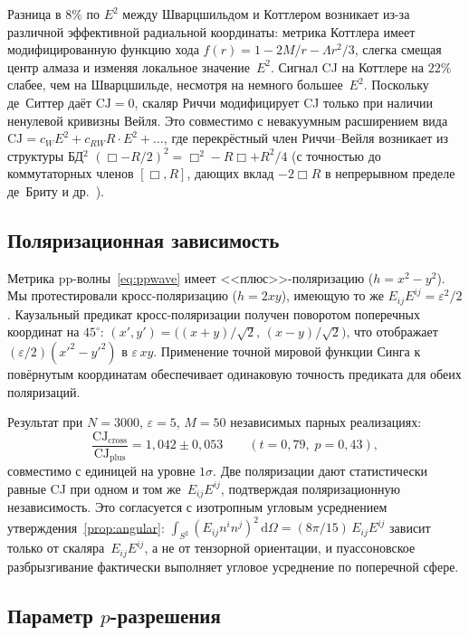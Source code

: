 \documentclass[12pt,a4paper]{article}
\theoremstyle{plain}
\theoremstyle{definition}
\theoremstyle{remark}
\newcommand{\dd}{\mathrm{d}}
\newcommand{\Esq}{E_{ij}E^{ij}}
\newcommand{\CJ}{\mathrm{CJ}}
\begin{document}
Разница в $8\%$ по $E^2$ между Шварцшильдом и Коттлером
возникает из-за различной эффективной радиальной координаты:
метрика Коттлера имеет модифицированную функцию хода
$f(r) = 1 - 2M/r - \Lambda r^2/3$, слегка смещая центр
алмаза и изменяя локальное значение~$E^2$.  Сигнал CJ на
Коттлере на $22\%$ слабее, чем на Шварцшильде, несмотря на
немного большее~$E^2$.  Поскольку де~Ситтер даёт $\CJ = 0$,
скаляр Риччи модифицирует CJ только при наличии ненулевой
кривизны Вейля.  Это совместимо с невакуумным расширением
вида $\CJ = c_W E^2 + c_{RW} R \cdot E^2 + \ldots$,
где перекрёстный член Риччи--Вейля возникает из структуры
БД${}^2$ $(\Box - R/2)^2 = \Box^2 - R\Box + R^2/4$
(с точностью до коммутаторных членов $[\Box, R]$, дающих
вклад $-2\Box R$ в непрерывном пределе де~Бриту и
др.~\cite{deBrito:2023}).

\subsection{Поляризационная зависимость}
\label{sec:polarisation}

Метрика pp-волны~\eqref{eq:ppwave} имеет
<<плюс>>-поляризацию ($h = x^2 - y^2$).  Мы протестировали
кросс-поляризацию ($h = 2xy$), имеющую то же
$\Esq = \varepsilon^2/2$.  Каузальный предикат
кросс-поляризации получен поворотом поперечных координат на
$45^\circ$:
$(x', y') = \bigl((x+y)/\sqrt{2},\, (x-y)/\sqrt{2}\bigr)$,
что отображает $(\varepsilon/2)(x'^2 - y'^2)$ в
$\varepsilon\, xy$.  Применение точной мировой функции
Синга к повёрнутым координатам обеспечивает одинаковую
точность предиката для обеих поляризаций.

Результат при $N = 3000$, $\varepsilon = 5$, $M = 50$
независимых парных реализациях:
\begin{equation}
  \frac{\CJ_{\mathrm{cross}}}{\CJ_{\mathrm{plus}}}
  = 1{,}042 \pm 0{,}053
  \qquad (t = 0{,}79,\; p = 0{,}43),
\end{equation}
совместимо с единицей на уровне $1\sigma$.  Две поляризации
дают статистически равные CJ при одном и том же~$\Esq$,
подтверждая поляризационную независимость.  Это согласуется
с изотропным угловым усреднением
утверждения~\ref{prop:angular}:
$\int_{S^2}(E_{ij}n^in^j)^2\,\dd\Omega = (8\pi/15)\,\Esq$
зависит только от скаляра~$\Esq$, а не от тензорной
ориентации, и пуассоновское разбрызгивание фактически
выполняет угловое усреднение по поперечной сфере.

\subsection{Параметр $p$-разрешения}
\label{sec:pdep}
\end{document}
